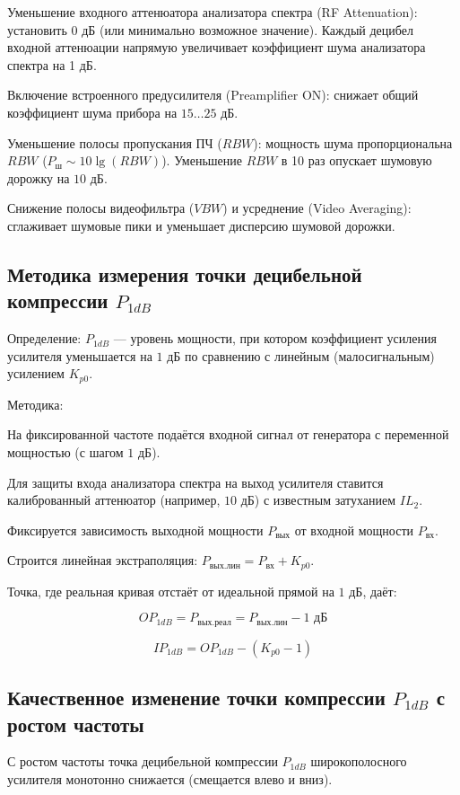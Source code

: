 Уменьшение входного аттенюатора анализатора спектра (RF Attenuation): установить $0\text{ дБ}$ (или минимально возможное значение). Каждый децибел входной аттенюации напрямую увеличивает коэффициент шума анализатора спектра на 1 дБ.

Включение встроенного предусилителя (Preamplifier ON): снижает общий коэффициент шума прибора на $15 \dots 25\text{ дБ}$.

Уменьшение полосы пропускания ПЧ ($RBW$): мощность шума пропорциональна $RBW$ ($P_{\text{ш}} \sim 10\lg(RBW)$). Уменьшение $RBW$ в 10 раз опускает шумовую дорожку на $10\text{ дБ}$.

Снижение полосы видеофильтра ($VBW$) и усреднение (Video Averaging): сглаживает шумовые пики и уменьшает дисперсию шумовой дорожки.

\subsection {Методика измерения точки децибельной компрессии $P_{1dB}$}

Определение: $P_{1dB}$ — уровень мощности, при котором коэффициент усиления усилителя уменьшается на $1\text{ дБ}$ по сравнению с линейным (малосигнальным) усилением $K_{p0}$.

Методика:

На фиксированной частоте подаётся входной сигнал от генератора с переменной мощностью (с шагом $1\text{ дБ}$).

Для защиты входа анализатора спектра на выход усилителя ставится калиброванный аттенюатор (например, $10\text{ дБ}$) с известным затуханием $IL_2$.

Фиксируется зависимость выходной мощности $P_{\text{вых}}$ от входной мощности $P_{\text{вх}}$.

Строится линейная экстраполяция: $P_{\text{вых.лин}} = P_{\text{вх}} + K_{p0}$.

Точка, где реальная кривая отстаёт от идеальной прямой на $1\text{ дБ}$, даёт:


$$OP_{1dB} = P_{\text{вых.реал}} = P_{\text{вых.лин}} - 1\text{ дБ}$$

$$IP_{1dB} = OP_{1dB} - (K_{p0} - 1)$$

\subsection {Качественное изменение точки компрессии $P_{1dB}$ с ростом частоты}

С ростом частоты точка децибельной компрессии $P_{1dB}$ широкополосного усилителя монотонно снижается (смещается влево и вниз).

